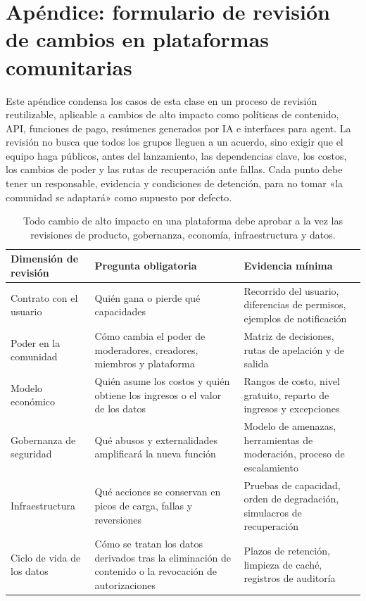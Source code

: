\section{Apéndice: formulario de revisión de cambios en plataformas comunitarias}

Este apéndice condensa los casos de esta clase en un proceso de revisión reutilizable, aplicable a cambios de alto impacto como políticas de contenido, API, funciones de pago, resúmenes generados por IA e interfaces para agent. La revisión no busca que todos los grupos lleguen a un acuerdo, sino exigir que el equipo haga públicos, antes del lanzamiento, las dependencias clave, los costos, los cambios de poder y las rutas de recuperación ante fallas. Cada punto debe tener un responsable, evidencia y condiciones de detención, para no tomar «la comunidad se adaptará» como supuesto por defecto.

\begin{table}[H]
\centering
\begin{tabular}{L{0.18\textwidth}L{0.33\textwidth}L{0.39\textwidth}}
\toprule
Dimensión de revisión & Pregunta obligatoria & Evidencia mínima \\
\midrule
Contrato con el usuario & Quién gana o pierde qué capacidades & Recorrido del usuario, diferencias de permisos, ejemplos de notificación \\
Poder en la comunidad & Cómo cambia el poder de moderadores, creadores, miembros y plataforma & Matriz de decisiones, rutas de apelación y de salida \\
Modelo económico & Quién asume los costos y quién obtiene los ingresos o el valor de los datos & Rangos de costo, nivel gratuito, reparto de ingresos y excepciones \\
Gobernanza de seguridad & Qué abusos y externalidades amplificará la nueva función & Modelo de amenazas, herramientas de moderación, proceso de escalamiento \\
Infraestructura & Qué acciones se conservan en picos de carga, fallas y reversiones & Pruebas de capacidad, orden de degradación, simulacros de recuperación \\
Ciclo de vida de los datos & Cómo se tratan los datos derivados tras la eliminación de contenido o la revocación de autorizaciones & Plazos de retención, limpieza de caché, registros de auditoría \\
\bottomrule
\end{tabular}
\caption{Todo cambio de alto impacto en una plataforma debe aprobar a la vez las revisiones de producto, gobernanza, economía, infraestructura y datos.}
\end{table}

